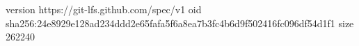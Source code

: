 version https://git-lfs.github.com/spec/v1
oid sha256:24e8929e128ad234ddd2e65fafa5f6a8ea7b3fc4b6d9f502416fc096df54d1f1
size 262240
